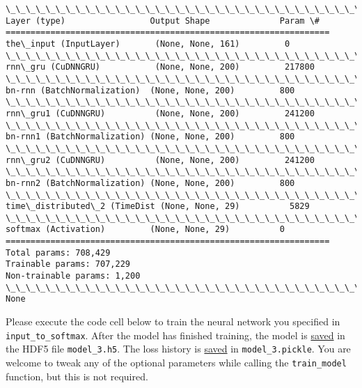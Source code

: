 \documentclass[11pt]{article}
\begin{document}
    \begin{Verbatim}[commandchars=\\\{\}]
\_\_\_\_\_\_\_\_\_\_\_\_\_\_\_\_\_\_\_\_\_\_\_\_\_\_\_\_\_\_\_\_\_\_\_\_\_\_\_\_\_\_\_\_\_\_\_\_\_\_\_\_\_\_\_\_\_\_\_\_\_\_\_\_\_
Layer (type)                 Output Shape              Param \#   
=================================================================
the\_input (InputLayer)       (None, None, 161)         0         
\_\_\_\_\_\_\_\_\_\_\_\_\_\_\_\_\_\_\_\_\_\_\_\_\_\_\_\_\_\_\_\_\_\_\_\_\_\_\_\_\_\_\_\_\_\_\_\_\_\_\_\_\_\_\_\_\_\_\_\_\_\_\_\_\_
rnn\_gru (CuDNNGRU)           (None, None, 200)         217800    
\_\_\_\_\_\_\_\_\_\_\_\_\_\_\_\_\_\_\_\_\_\_\_\_\_\_\_\_\_\_\_\_\_\_\_\_\_\_\_\_\_\_\_\_\_\_\_\_\_\_\_\_\_\_\_\_\_\_\_\_\_\_\_\_\_
bn-rnn (BatchNormalization)  (None, None, 200)         800       
\_\_\_\_\_\_\_\_\_\_\_\_\_\_\_\_\_\_\_\_\_\_\_\_\_\_\_\_\_\_\_\_\_\_\_\_\_\_\_\_\_\_\_\_\_\_\_\_\_\_\_\_\_\_\_\_\_\_\_\_\_\_\_\_\_
rnn\_gru1 (CuDNNGRU)          (None, None, 200)         241200    
\_\_\_\_\_\_\_\_\_\_\_\_\_\_\_\_\_\_\_\_\_\_\_\_\_\_\_\_\_\_\_\_\_\_\_\_\_\_\_\_\_\_\_\_\_\_\_\_\_\_\_\_\_\_\_\_\_\_\_\_\_\_\_\_\_
bn-rnn1 (BatchNormalization) (None, None, 200)         800       
\_\_\_\_\_\_\_\_\_\_\_\_\_\_\_\_\_\_\_\_\_\_\_\_\_\_\_\_\_\_\_\_\_\_\_\_\_\_\_\_\_\_\_\_\_\_\_\_\_\_\_\_\_\_\_\_\_\_\_\_\_\_\_\_\_
rnn\_gru2 (CuDNNGRU)          (None, None, 200)         241200    
\_\_\_\_\_\_\_\_\_\_\_\_\_\_\_\_\_\_\_\_\_\_\_\_\_\_\_\_\_\_\_\_\_\_\_\_\_\_\_\_\_\_\_\_\_\_\_\_\_\_\_\_\_\_\_\_\_\_\_\_\_\_\_\_\_
bn-rnn2 (BatchNormalization) (None, None, 200)         800       
\_\_\_\_\_\_\_\_\_\_\_\_\_\_\_\_\_\_\_\_\_\_\_\_\_\_\_\_\_\_\_\_\_\_\_\_\_\_\_\_\_\_\_\_\_\_\_\_\_\_\_\_\_\_\_\_\_\_\_\_\_\_\_\_\_
time\_distributed\_2 (TimeDist (None, None, 29)          5829      
\_\_\_\_\_\_\_\_\_\_\_\_\_\_\_\_\_\_\_\_\_\_\_\_\_\_\_\_\_\_\_\_\_\_\_\_\_\_\_\_\_\_\_\_\_\_\_\_\_\_\_\_\_\_\_\_\_\_\_\_\_\_\_\_\_
softmax (Activation)         (None, None, 29)          0         
=================================================================
Total params: 708,429
Trainable params: 707,229
Non-trainable params: 1,200
\_\_\_\_\_\_\_\_\_\_\_\_\_\_\_\_\_\_\_\_\_\_\_\_\_\_\_\_\_\_\_\_\_\_\_\_\_\_\_\_\_\_\_\_\_\_\_\_\_\_\_\_\_\_\_\_\_\_\_\_\_\_\_\_\_
None

    \end{Verbatim}

    Please execute the code cell below to train the neural network you
specified in \texttt{input\_to\_softmax}. After the model has finished
training, the model is
\href{https://keras.io/getting-started/faq/\#how-can-i-save-a-keras-model}{saved}
in the HDF5 file \texttt{model\_3.h5}. The loss history is
\href{https://wiki.python.org/moin/UsingPickle}{saved} in
\texttt{model\_3.pickle}. You are welcome to tweak any of the optional
parameters while calling the \texttt{train\_model} function, but this is
not required.
\end{document}
